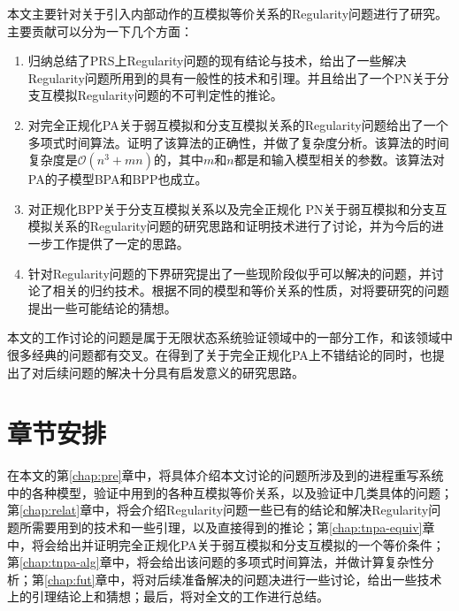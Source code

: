 本文主要针对关于引入内部动作的互模拟等价关系的Regularity问题进行了研究。主要贡献可以分为一下几个方面：

\begin{enumerate}
	\item 归纳总结了PRS上Regularity问题的现有结论与技术，给出了一些解决Regularity问题所用到的具有一般性的技术和引理。并且给出了一个PN关于分支互模拟Regularity问题的不可判定性的推论。
	\item 对完全正规化PA关于弱互模拟和分支互模拟关系的Regularity问题给出了一个多项式时间算法。证明了该算法的正确性，并做了复杂度分析。该算法的时间复杂度是$\mathscr{O}(n^3+mn)$的，其中$m$和$n$都是和输入模型相关的参数。该算法对PA的子模型BPA和BPP也成立。
	\item 对正规化BPP关于分支互模拟关系以及完全正规化 PN关于弱互模拟和分支互模拟关系的Regularity问题的研究思路和证明技术进行了讨论，并为今后的进一步工作提供了一定的思路。
	\item 针对Regularity问题的下界研究提出了一些现阶段似乎可以解决的问题，并讨论了相关的归约技术。根据不同的模型和等价关系的性质，对将要研究的问题提出一些可能结论的猜想。
\end{enumerate}

本文的工作讨论的问题是属于无限状态系统验证领域中的一部分工作，和该领域中很多经典的问题都有交叉。在得到了关于完全正规化PA上不错结论的同时，也提出了对后续问题的解决十分具有启发意义的研究思路。

\section{章节安排}
\label{sec:section}

在本文的第\ref{chap:pre}章中，将具体介绍本文讨论的问题所涉及到的进程重写系统中的各种模型，验证中用到的各种互模拟等价关系，以及验证中几类具体的问题；第\ref{chap:relat}章中，将会介绍Regularity问题一些已有的结论和解决Regularity问题所需要用到的技术和一些引理，以及直接得到的推论；第\ref{chap:tnpa-equiv}章中，将会给出并证明完全正规化PA关于弱互模拟和分支互模拟的一个等价条件；第\ref{chap:tnpa-alg}章中，将会给出该问题的多项式时间算法，并做计算复杂性分析；第\ref{chap:fut}章中，将对后续准备解决的问题决进行一些讨论，给出一些技术上的引理结论上和猜想；最后，将对全文的工作进行总结。
